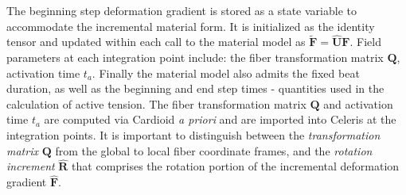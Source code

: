 The beginning step deformation gradient is stored as a state variable to accommodate the incremental material form. It is initialized as the identity tensor and updated within each call to the material model as $\tilde{\bm{F}} = \hat{\bm{U}}\bm{F}$. Field parameters at each integration point include: the fiber transformation matrix $\bm{Q}$, activation time $t_a$. Finally the material model also admits the fixed beat duration, as well as the beginning and end step times - quantities used in the calculation of active tension. The fiber transformation matrix $\bm{Q}$ and activation time $t_a$ are computed via Cardioid \textit{a priori} and are imported into Celeris at the integration points. It is important to distinguish between the \textit{transformation matrix} $\bm{Q}$ from the global to local fiber coordinate frames, and the \textit{rotation increment} $\hat{\bm{R}}$ that comprises the rotation portion of the incremental deformation gradient $\hat{\bm{F}}$.

